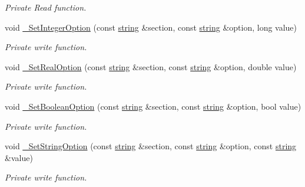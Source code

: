 \begin{DoxyCompactItemize}
\begin{DoxyCompactList}\small\item\em Private Read function. \end{DoxyCompactList}\item 
void \hyperlink{class_ensum_1_1_utils_1_1_options_a8ed2a91a05fbabe8e83916adea5b2b96}{\+\_\+\+Set\+Integer\+Option} (const \hyperlink{class_ensum_1_1string}{string} \&section, const \hyperlink{class_ensum_1_1string}{string} \&option, long value)\hypertarget{class_ensum_1_1_utils_1_1_options_a8ed2a91a05fbabe8e83916adea5b2b96}{}\label{class_ensum_1_1_utils_1_1_options_a8ed2a91a05fbabe8e83916adea5b2b96}

\begin{DoxyCompactList}\small\item\em Private write function. \end{DoxyCompactList}\item 
void \hyperlink{class_ensum_1_1_utils_1_1_options_a1e6721c6556806ea91df7739c63e9ba2}{\+\_\+\+Set\+Real\+Option} (const \hyperlink{class_ensum_1_1string}{string} \&section, const \hyperlink{class_ensum_1_1string}{string} \&option, double value)\hypertarget{class_ensum_1_1_utils_1_1_options_a1e6721c6556806ea91df7739c63e9ba2}{}\label{class_ensum_1_1_utils_1_1_options_a1e6721c6556806ea91df7739c63e9ba2}

\begin{DoxyCompactList}\small\item\em Private write function. \end{DoxyCompactList}\item 
void \hyperlink{class_ensum_1_1_utils_1_1_options_ae7f2dc1a114d67fbe049454f6bb1aa1e}{\+\_\+\+Set\+Boolean\+Option} (const \hyperlink{class_ensum_1_1string}{string} \&section, const \hyperlink{class_ensum_1_1string}{string} \&option, bool value)\hypertarget{class_ensum_1_1_utils_1_1_options_ae7f2dc1a114d67fbe049454f6bb1aa1e}{}\label{class_ensum_1_1_utils_1_1_options_ae7f2dc1a114d67fbe049454f6bb1aa1e}

\begin{DoxyCompactList}\small\item\em Private write function. \end{DoxyCompactList}\item 
void \hyperlink{class_ensum_1_1_utils_1_1_options_a7ba0b31a187c20ffec4725b5f1fd9003}{\+\_\+\+Set\+String\+Option} (const \hyperlink{class_ensum_1_1string}{string} \&section, const \hyperlink{class_ensum_1_1string}{string} \&option, const \hyperlink{class_ensum_1_1string}{string} \&value)\hypertarget{class_ensum_1_1_utils_1_1_options_a7ba0b31a187c20ffec4725b5f1fd9003}{}\label{class_ensum_1_1_utils_1_1_options_a7ba0b31a187c20ffec4725b5f1fd9003}

\begin{DoxyCompactList}\small\item\em Private write function. \end{DoxyCompactList}\end{DoxyCompactItemize}

